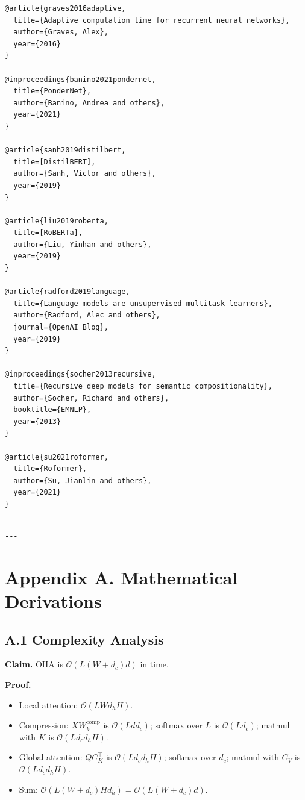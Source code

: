 \begin{lstlisting}
@article{graves2016adaptive,
  title={Adaptive computation time for recurrent neural networks},
  author={Graves, Alex},
  year={2016}
}

@inproceedings{banino2021pondernet,
  title={PonderNet},
  author={Banino, Andrea and others},
  year={2021}
}

@article{sanh2019distilbert,
  title=[DistilBERT],
  author={Sanh, Victor and others},
  year={2019}
}

@article{liu2019roberta,
  title=[RoBERTa],
  author={Liu, Yinhan and others},
  year={2019}
}

@article{radford2019language,
  title={Language models are unsupervised multitask learners},
  author={Radford, Alec and others},
  journal={OpenAI Blog},
  year={2019}
}

@inproceedings{socher2013recursive,
  title={Recursive deep models for semantic compositionality},
  author={Socher, Richard and others},
  booktitle={EMNLP},
  year={2013}
}

@article{su2021roformer,
  title={Roformer},
  author={Su, Jianlin and others},
  year={2021}
}
\end{lstlisting}
\begin{lstlisting}

---
\end{lstlisting}


\section{Appendix A. Mathematical Derivations}

\subsection{A.1 Complexity Analysis}

\textbf{Claim.} OHA is $\mathcal{O}(L(W + d_c) d)$ in time.

\textbf{Proof.} 
\begin{itemize}
\item Local attention: $\mathcal{O}(L W d_h H)$.
\item Compression: $X W_k^\text{comp}$ is $\mathcal{O}(L d d_c)$; softmax over $L$ is $\mathcal{O}(L d_c)$; matmul with $K$ is $\mathcal{O}(L d_c d_h H)$.
\item Global attention: $Q C_K^\top$ is $\mathcal{O}(L d_c d_h H)$; softmax over $d_c$; matmul with $C_V$ is $\mathcal{O}(L d_c d_h H)$.
\item Sum: $\mathcal{O}(L(W + d_c) H d_h) = \mathcal{O}(L(W + d_c) d)$.

\end{itemize}
